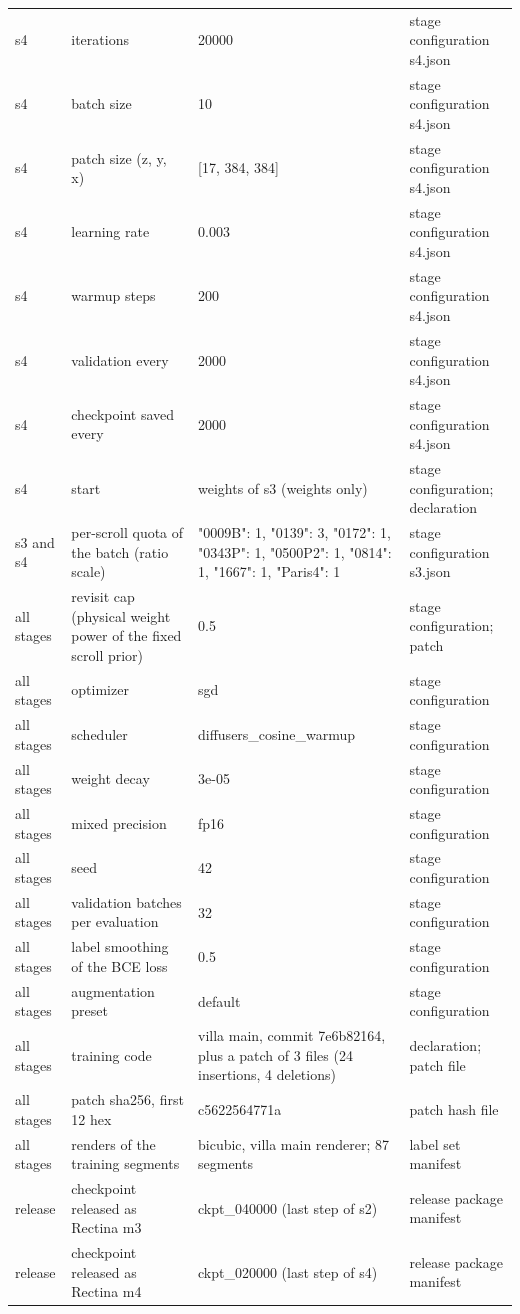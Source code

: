 {\begin{longtable}{@{}p{2.2cm}p{4.6cm}p{5.2cm}p{4.4cm}@{}}
s4 & iterations & 20000 & stage configuration s4.\allowbreak{}json \\
s4 & batch size & 10 & stage configuration s4.\allowbreak{}json \\
s4 & patch size (z,\allowbreak{} y,\allowbreak{} x) & [17, 384, 384] & stage configuration s4.\allowbreak{}json \\
s4 & learning rate & 0.003 & stage configuration s4.\allowbreak{}json \\
s4 & warmup steps & 200 & stage configuration s4.\allowbreak{}json \\
s4 & validation every & 2000 & stage configuration s4.\allowbreak{}json \\
s4 & checkpoint saved every & 2000 & stage configuration s4.\allowbreak{}json \\
s4 & start & weights of s3 (weights only) & stage configuration; declaration \\
s3 and s4 & per-scroll quota of the batch (ratio scale) & {"0009B":\allowbreak{} 1,\allowbreak{} "0139":\allowbreak{} 3,\allowbreak{} "0172":\allowbreak{} 1,\allowbreak{} "0343P":\allowbreak{} 1,\allowbreak{} "0500P2":\allowbreak{} 1,\allowbreak{} "0814":\allowbreak{} 1,\allowbreak{} "1667":\allowbreak{} 1,\allowbreak{} "Paris4":\allowbreak{} 1} & stage configuration s3.\allowbreak{}json \\
all stages & revisit cap (physical weight power of the fixed scroll prior) & 0.5 & stage configuration; patch \\
all stages & optimizer & sgd & stage configuration \\
all stages & scheduler & diffusers\_cosine\_warmup & stage configuration \\
all stages & weight decay & 3e-05 & stage configuration \\
all stages & mixed precision & fp16 & stage configuration \\
all stages & seed & 42 & stage configuration \\
all stages & validation batches per evaluation & 32 & stage configuration \\
all stages & label smoothing of the BCE loss & 0.5 & stage configuration \\
all stages & augmentation preset & default & stage configuration \\
all stages & training code & villa main,\allowbreak{} commit 7e6b82164,\allowbreak{} plus a patch of 3 files (24 insertions,\allowbreak{} 4 deletions) & declaration; patch file \\
all stages & patch sha256,\allowbreak{} first 12 hex & c5622564771a & patch hash file \\
all stages & renders of the training segments & bicubic,\allowbreak{} villa main renderer; 87 segments & label set manifest \\
release & checkpoint released as Rectina m3 & ckpt\_040000 (last step of s2) & release package manifest \\
release & checkpoint released as Rectina m4 & ckpt\_020000 (last step of s4) & release package manifest \\
\end{longtable}}
\twocolumn
